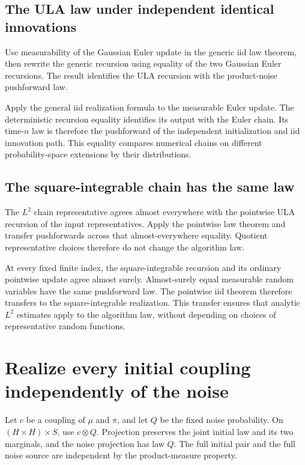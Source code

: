 \documentclass[11pt,a4paper]{article}
\begin{document}
\subsection{\texorpdfstring{The ULA law under independent identical innovations}{The ULA law under independent identical innovations}}


Use measurability of the Gaussian Euler update in the generic iid law theorem, then rewrite the generic recursion using equality of the two Gaussian Euler recursions. The result identifies the ULA recursion with the product-noise pushforward law.



Apply the general iid realization formula to the measurable Euler update. The deterministic recursion equality identifies its output with the Euler chain. Its time-\(n\) law is therefore the pushforward of the independent initialization and iid innovation path. This equality compares numerical chains on different probability-space extensions by their distributions.


\subsection{\texorpdfstring{The square-integrable chain has the same law}{The square-integrable chain has the same law}}


The \(L^2\) chain representative agrees almost everywhere with the pointwise ULA recursion of the input representatives. Apply the pointwise law theorem and transfer pushforwards across that almost-everywhere equality. Quotient representative choices therefore do not change the algorithm law.



At every fixed finite index, the square-integrable recursion and its ordinary pointwise update agree almost surely. Almost-surely equal measurable random variables have the same pushforward law. The pointwise iid theorem therefore transfers to the square-integrable realization. This transfer ensures that analytic \(L^2\) estimates apply to the algorithm law, without depending on choices of representative random functions.


\section{\texorpdfstring{Realize every initial coupling independently of the noise}{Realize every initial coupling independently of the noise}}


Let \(c\) be a coupling of \(\mu\) and \(\pi\), and let \(Q\) be the fixed noise probability. On \((H\times H)\times S\), use \(c\otimes Q\). Projection preserves the joint initial law and its two marginals, and the noise projection has law \(Q\). The full initial pair and the full noise source are independent by the product-measure property.
\end{document}
